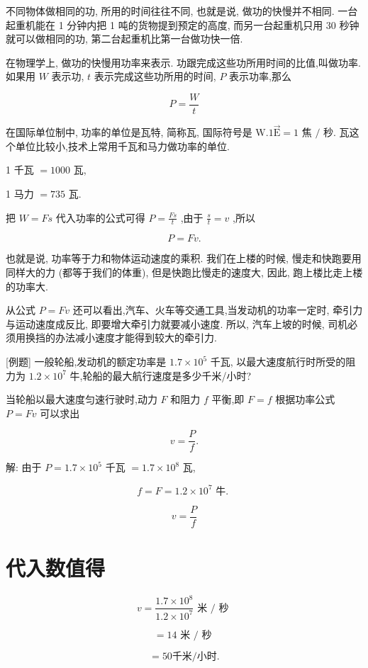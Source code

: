 \documentclass[10pt]{article}
\begin{document}
不同物体做相同的功, 所用的时间往往不同, 也就是说, 做功的快慢并不相同. 一台起重机能在 1 分钟内把 1 吨的货物提到预定的高度, 而另一台起重机只用 30 秒钟就可以做相同的功, 第二台起重机比第一台做功快一倍.

在物理学上, 做功的快慢用功率来表示. 功跟完成这些功所用时间的比值,叫做功率. 如果用 \(W\) 表示功, \(t\) 表示完成这些功所用的时间, \(P\) 表示功率,那么

\[
P = \frac{W}{t}
\]

在国际单位制中, 功率的单位是瓦特, 简称瓦, 国际符号是 \(\mathrm{W}{.1}\overrightarrow{\mathrm{E}} = 1\) 焦 \(/\) 秒. 瓦这个单位比较小,技术上常用千瓦和马力做功率的单位.

1 千瓦 \(= {1000}\) 瓦,

1 马力 \(= {735}\) 瓦.

把 \(W = {Fs}\) 代入功率的公式可得 \(P = \frac{Fs}{t}\) ,由于 \(\frac{s}{t} = v\) ,所以

\[
P = {Fv}\text{.}
\]

也就是说, 功率等于力和物体运动速度的乘积. 我们在上楼的时候, 慢走和快跑要用同样大的力 (都等于我们的体重), 但是快跑比慢走的速度大, 因此, 跑上楼比走上楼的功率大.

从公式 \(P = {Fv}\) 还可以看出,汽车、火车等交通工具,当发动机的功率一定时, 牵引力与运动速度成反比, 即要增大牵引力就要减小速度. 所以, 汽车上坡的时候, 司机必须用换挡的办法减小速度才能得到较大的牵引力.

[例题] 一般轮船,发动机的额定功率是 \({1.7} \times {10}^{5}\) 千瓦, 以最大速度航行时所受的阻力为 \({1.2} \times {10}^{7}\) 牛,轮船的最大航行速度是多少千米/小时?

当轮船以最大速度匀速行驶时,动力 \(F\) 和阻力 \(f\) 平衡,即 \(F = f\) 根据功率公式 \(P = {Fv}\) 可以求出

\[
v = \frac{P}{f}.
\]

解: 由于 \(P = {1.7} \times {10}^{5}\) 千瓦 \(= {1.7} \times {10}^{8}\) 瓦,

\[
f = F = {1.2} \times {10}^{7}\text{ 牛. }
\]

\[
v = \frac{P}{f}
\]

\section*{代入数值得}

\[
v = \frac{{1.7} \times {10}^{8}}{{1.2} \times {10}^{7}}\text{ 米 }/\text{ 秒 }
\]

\[
= {14}\text{ 米 }/\text{ 秒 }
\]

\[
= {50}\text{千米/小时.}
\]
\end{document}
